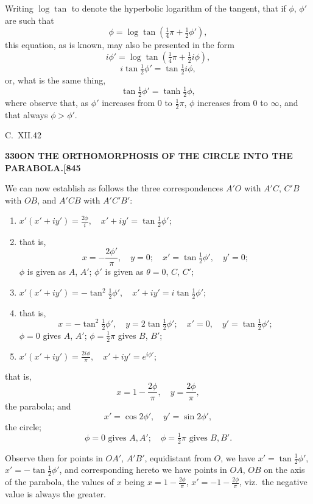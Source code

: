 \documentclass[11pt,a4paper]{book}
\begin{document}
Writing $\log\tan$ to denote the hyperbolic logarithm of the tangent, that if $\phi$, $\phi'$ are such that
\[
\phi = \log\tan(\tfrac{1}{4}\pi + \tfrac{1}{2}\phi'),
\]
this equation, as is known, may also be presented in the form
\[
i\phi' = \log\tan(\tfrac{1}{4}\pi + \tfrac{1}{2}i\phi),
\]
\[
i\tan\tfrac{1}{2}\phi' = \tan\tfrac{1}{2}i\phi,
\]
or, what is the same thing,
\[
\tan\tfrac{1}{2}\phi' = \tanh\tfrac{1}{2}\phi,
\]
where observe that, as $\phi'$ increases from $0$ to $\tfrac{1}{2}\pi$, $\phi$ increases from $0$ to $\infty$, and that always $\phi > \phi'$.

\hfill C.\ XII.\hfill 42

\newpage
\setcounter{page}{330}

\noindent\textbf{330}\hfill\textbf{ON THE ORTHOMORPHOSIS OF THE CIRCLE INTO THE PARABOLA.}\hfill\textbf{[845}

\bigskip

\noindent We can now establish as follows the three correspondences $A'O$ with $A'C$, $C'B$ with $OB$, and $A'CB$ with $A'C'B'$:
\begin{enumerate}
\item[(1)] $x'(x' + iy') = \frac{2\phi}{i}, \quad x' + iy' = \tan\tfrac{1}{2}\phi'$;
\item[]
that is,
\[
x = -\frac{2\phi'}{\pi}, \quad y = 0; \quad x' = \tan\tfrac{1}{2}\phi', \quad y' = 0;
\]
$\phi$ is given as $A$, $A'$; $\phi'$ is given as $\theta = 0$, $C$, $C'$;
\item[(2)] $x'(x' + iy') = -\tan^2\tfrac{1}{2}\phi', \quad x' + iy' = i\tan\tfrac{1}{2}\phi';$
\item[]
that is,
\[
x = -\tan^2\tfrac{1}{2}\phi', \quad y = 2\tan\tfrac{1}{2}\phi'; \quad x' = 0, \quad y' = \tan\tfrac{1}{2}\phi';
\]
$\phi = 0$ gives $A$, $A'$; $\phi = \tfrac{1}{2}\pi$ gives $B$, $B'$;
\item[(3)] $x'(x' + iy') = \frac{2i\phi}{\pi}, \quad x' + iy' = e^{i\phi'};$
\end{enumerate}
that is,
\[
x = 1 - \frac{2\phi}{\pi}, \quad y = \frac{2\phi}{\pi},
\]
the parabola; and
\[
x' = \cos 2\phi', \quad y' = \sin 2\phi',
\]
the circle;
\[
\phi = 0 \text{ gives } A, A'; \quad \phi = \tfrac{1}{2}\pi \text{ gives } B, B'.
\]

Observe then for points in $OA'$, $A'B'$, equidistant from $O$, we have $x' = \tan\tfrac{1}{2}\phi'$, $x' = -\tan\tfrac{1}{2}\phi'$, and corresponding hereto we have points in $OA$, $OB$ on the axis of the parabola, the values of $x$ being $x = 1 - \frac{2\phi}{\pi}$, $x' = -1 - \frac{2\phi}{\pi}$, viz.\ the negative value is always the greater.
\end{document}
